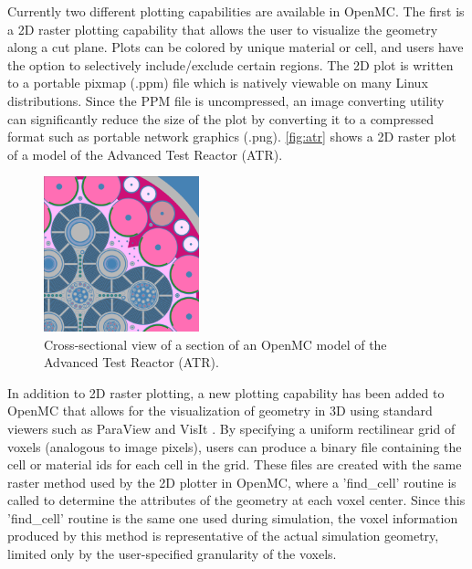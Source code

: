 \documentclass{snamc2013}
\begin{document}
Currently two different plotting capabilities are available in OpenMC. The first
is a 2D raster plotting capability that allows the user to visualize the
geometry along a cut plane. Plots can be colored by unique material or cell, and
users have the option to selectively include/exclude certain regions. The 2D
plot is written to a portable pixmap (.ppm) file which is natively viewable on
many Linux distributions. Since the PPM file is uncompressed, an image
converting utility can significantly reduce the size of the plot by converting
it to a compressed format such as portable network graphics
(.png). \autoref{fig:atr} shows a 2D raster plot of a model of the Advanced Test
Reactor (ATR).
\begin{figure}[htb]
  \centering
  \includegraphics[width=0.4\textwidth]{images/atr.png}
  \caption{Cross-sectional view of a section of an OpenMC model of the Advanced
    Test Reactor (ATR).}
  \label{fig:atr}
\end{figure}

In addition to 2D raster plotting, a new plotting capability has been added to
OpenMC that allows for the visualization of geometry in 3D using standard
viewers such as ParaView \cite{squillicote-2007} and VisIt \cite{visit-2005}. By
specifying a uniform rectilinear grid of voxels (analogous to image pixels),
users can produce a binary file containing the cell or material ids for each
cell in the grid.  These files are created with the same raster method used by
the 2D plotter in OpenMC, where a 'find\_cell' routine is called to determine
the attributes of the geometry at each voxel center.  Since this 'find\_cell'
routine is the same one used during simulation, the voxel information produced
by this method is representative of the actual simulation geometry, limited only
by the user-specified granularity of the voxels.
\end{document}
